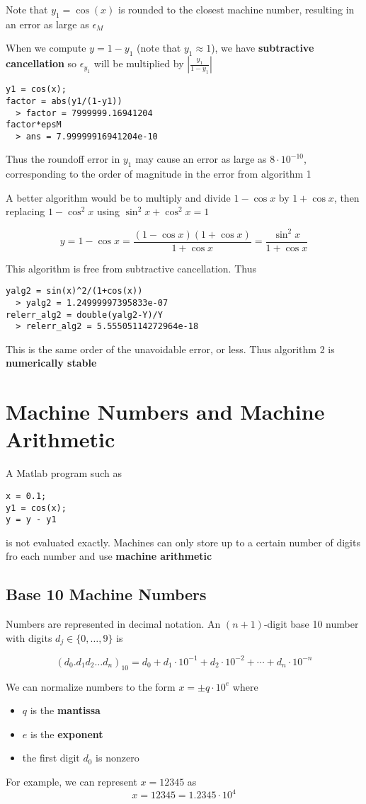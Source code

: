 \documentclass{article}
\begin{document}
  Note that $y_1 = \cos(x)$ is rounded to the closest machine number, resulting in an error as large as $\epsilon_M$

  When we compute $y = 1- y_1$ (note that $y_1 \approx 1$), we have \textbf{subtractive cancellation} so $\epsilon_{y_1}$ will be multiplied by $\left| \frac{y_1}{1 - y_1} \right|$

\begin{lstlisting}
y1 = cos(x);
factor = abs(y1/(1-y1)) 
  > factor = 7999999.16941204
factor*epsM
  > ans = 7.99999916941204e-10
\end{lstlisting}
Thus the roundoff error in $y_1$ may cause an error as large as $8 \cdot 10^{-10}$, corresponding to the order of magnitude in the error from algorithm 1

A better algorithm would be to multiply and divide $1 - \cos{x}$ by $1 + \cos{x}$, then replacing $1 - \cos^2{x}$ using $\sin^2{x} + \cos^2{x} = 1$

\[ y = 1 - \cos{x} = \frac{(1 - \cos{x})(1 + \cos{x})}{1 + \cos{x}} = \frac{\sin^2{x}}{1 + \cos{x}}\]

This algorithm is free from subtractive cancellation. Thus
\begin{lstlisting}
yalg2 = sin(x)^2/(1+cos(x))
  > yalg2 = 1.24999997395833e-07
relerr_alg2 = double(yalg2-Y)/Y
  > relerr_alg2 = 5.55505114272964e-18 
\end{lstlisting}
This is the same order of the unavoidable error, or less. Thus algorithm 2 is \textbf{numerically stable}
\section{Machine Numbers and Machine Arithmetic}
A Matlab program such as
\begin{lstlisting}
x = 0.1;
y1 = cos(x);
y = y - y1
\end{lstlisting}
is not evaluated exactly. Machines can only store up to a certain number of digits fro each number and use \textbf{machine arithmetic}
\subsection{Base 10 Machine Numbers}
Numbers are represented in decimal notation. An $(n+1)$-digit base 10 number with digits $d_j \in \{0, \ldots, 9\}$ is

\[(d_0 . d_1 d_2 \ldots d_n)_{10} = d_0 + d_1 \cdot 10^{-1} + d_2 \cdot 10^{-2} + \cdots + d_n \cdot 10^{-n}\]

We can normalize numbers to the form $x = \pm q \cdot 10^e$ where
\begin{itemize}
  \item $q$ is the \textbf{mantissa}
  \item $e$ is the \textbf{exponent}
  \item the first digit $d_0$ is nonzero
\end{itemize}
For example, we can represent $x = 12345$ as
\[x = 12345 = 1.2345 \cdot 10^4\]
\end{document}
